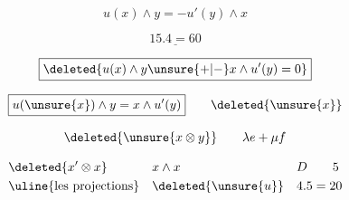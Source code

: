 \[
u(x)\wedge y=-u'(y)\wedge x
\]

\[
\underline{15.4=60}
\]

\[
\boxed{\deleted{u(x)\wedge y\unsure{+|-}x\wedge u'(y)=0}}
\]

\[
\boxed{u(\unsure{x})\wedge y=x\wedge u'(y)}\qquad\deleted{\unsure{x}}
\]

\[
\deleted{\unsure{x\otimes y}}\qquad\lambda e+\mu f
\]

\[
\begin{aligned}
&\deleted{x'\otimes x}&&x\wedge x&&D\qquad5\\
&\text{\uline{les projections}}&&\deleted{\unsure{u}}&&4.5=20
\end{aligned}
\]

